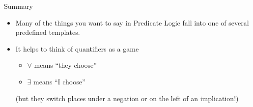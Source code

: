 \documentclass[xetex,aspectratio=169,14pt,hyperref={pdfpagelabels=true,pdflang={en-GB}}]{beamer}
\begin{document}
\begin{frame}
  {Summary}

  \begin{itemize}
  \item Many of the things you want to say in Predicate Logic fall
    into one of several predefined templates.
  \item It helps to think of quantifiers as a game
    \begin{itemize}
    \item $\forall$ means ``they choose''
    \item $\exists$ means ``I choose''
    \end{itemize}
    (but they switch places under a negation or on the left of an
    implication!)
  \end{itemize}
\end{frame}
\end{document}
